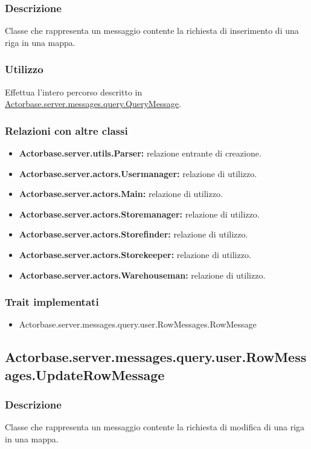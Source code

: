 \documentclass[a4paper]{article}
\begin{document}
			\subsubsection{Descrizione}
				Classe che rappresenta un messaggio contente la richiesta di inserimento di una riga in una mappa.
				
			\subsubsection{Utilizzo}
				Effettua l'intero percorso descritto in \hyperref[QueryMessage]{Actorbase.server.messages.query.QueryMessage}.
				
			\subsubsection{Relazioni con altre classi}
				\begin{itemize}
					\item \textbf{Actorbase.server.utils.Parser:} relazione entrante di creazione.
					\item \textbf{Actorbase.server.actors.Usermanager:} relazione di utilizzo.
					\item \textbf{Actorbase.server.actors.Main:} relazione di utilizzo.
					\item \textbf{Actorbase.server.actors.Storemanager:} relazione di utilizzo.
					\item \textbf{Actorbase.server.actors.Storefinder:} relazione di utilizzo.
					\item \textbf{Actorbase.server.actors.Storekeeper:} relazione di utilizzo.
					\item \textbf{Actorbase.server.actors.Warehouseman:} relazione di utilizzo.
				\end{itemize}
			\subsubsection{Trait implementati}
				\begin{itemize}
					\item Actorbase.server.messages.query.user.RowMessages.RowMessage
				\end{itemize}
		
		\subsection{Actorbase.server.messages.query.user.RowMessages.UpdateRowMessage}
			\subsubsection{Descrizione}
				Classe che rappresenta un messaggio contente la richiesta di modifica di una riga in una mappa.
				
\end{document}
